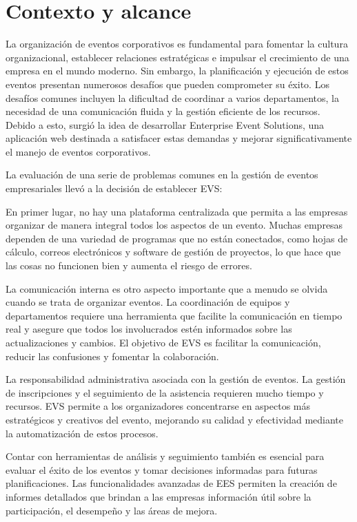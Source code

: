 
\section{Contexto y alcance}

La organización de eventos corporativos es fundamental para fomentar la cultura organizacional, 
establecer relaciones estratégicas e impulsar el crecimiento de una empresa en el mundo moderno. 
Sin embargo, la planificación y ejecución de estos eventos presentan numerosos desafíos que pueden comprometer su éxito. 
Los desafíos comunes incluyen la dificultad de coordinar a varios departamentos, la necesidad de una comunicación fluida y 
la gestión eficiente de los recursos. Debido a esto, surgió la idea de desarrollar Enterprise Event Solutions, una aplicación web destinada a satisfacer estas 
demandas y mejorar significativamente el manejo de eventos corporativos.

La evaluación de una serie de problemas comunes en la gestión de eventos empresariales llevó a la decisión de establecer EVS:

En primer lugar, no hay una plataforma centralizada que permita a las empresas organizar de manera integral todos los aspectos de un evento. 
Muchas empresas dependen de una variedad de programas que no están conectados, como hojas de cálculo, correos electrónicos y software de gestión de 
proyectos, lo que hace que las cosas no funcionen bien y aumenta el riesgo de errores.

La comunicación interna es otro aspecto importante que a menudo se olvida cuando se trata de organizar eventos. La coordinación de equipos y 
departamentos requiere una herramienta que facilite la comunicación en tiempo real y asegure que todos los involucrados estén informados sobre las 
actualizaciones y cambios. El objetivo de EVS es facilitar la comunicación, reducir las confusiones y fomentar la colaboración.

La responsabilidad administrativa asociada con la gestión de eventos. 
La gestión de inscripciones y el seguimiento de 
la asistencia requieren mucho tiempo y recursos. EVS permite a los organizadores 
concentrarse en aspectos más estratégicos y creativos del evento, mejorando su calidad y 
efectividad mediante la automatización de estos procesos.

Contar con herramientas de análisis y seguimiento también es esencial para evaluar el éxito de los eventos y tomar 
decisiones informadas para futuras planificaciones. Las funcionalidades avanzadas de EES permiten la creación de informes 
detallados que brindan a las empresas información útil sobre la participación, el desempeño y las áreas de mejora.

